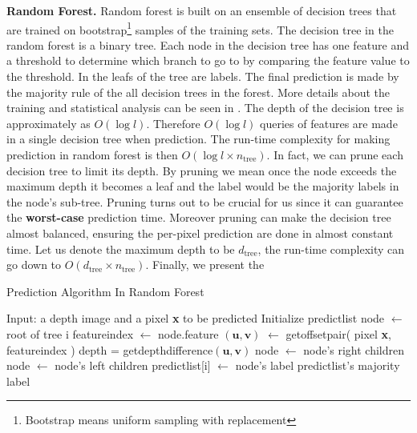 \textbf{Random Forest.} Random forest is built on an ensemble of decision trees that are trained on  bootstrap\footnote{Bootstrap means uniform   sampling with replacement} samples of the training sets. The decision tree in the random forest is a binary tree. Each node in the decision tree has one feature and a threshold to determine which branch to go to by comparing the feature value to the threshold. In the leafs of the tree are labels. The final prediction is made by the majority rule of the all decision trees in the forest. More details about the training and statistical analysis can be seen in . The depth of the decision tree is approximately as $O(\log l)$. Therefore $O(\log l)$ queries of features are made in a single decision tree when prediction. The run-time complexity for making prediction in random forest is then $O(\log l \times n_{\text{tree}})$. In fact, we can prune each decision tree to limit its depth. By pruning we mean once the node exceeds the maximum depth it becomes a leaf and the label would be the majority labels in the node's sub-tree. Pruning turns out to be crucial for us since it can guarantee the \textbf{worst-case} prediction time. Moreover pruning can make the decision tree almost balanced, ensuring the per-pixel prediction are done in almost constant time. Let us denote the maximum depth to be  $d_{\text{tree}}$, the run-time complexity can go down to $O(d_{\text{tree}}\times n_{\text{tree}})$. Finally, we present the 

\begin{algorithm} 
 \caption{Prediction Algorithm In Random Forest} 
 \label{alg: RF}
\begin{algorithmic}

\STATE Input: a depth image and a pixel \textbf{x} to be predicted
\STATE Initialize predict\textunderscore list
     \STATE node $\leftarrow$ root of tree i
	   \STATE feature\textunderscore index $\leftarrow$ node.feature
       \STATE $(\textbf{u}, \textbf{v})$ $\leftarrow$ get\textunderscore offset\textunderscore pair( pixel \textbf{x}, feature\textunderscore index )
	   \STATE depth = get\textunderscore depth\textunderscore difference$(\textbf{u}, \textbf{v})$
	      \STATE node $\leftarrow$ node's right children	
	   \ELSE
	      \STATE node $\leftarrow$ node's left children
       \ENDIF
    \ENDWHILE     
    \STATE predict\textunderscore list[i] $\leftarrow$ node's label
  \ENDFOR
\RETURN predict\textunderscore list's majority label
\end{algorithmic}
\end{algorithm}

